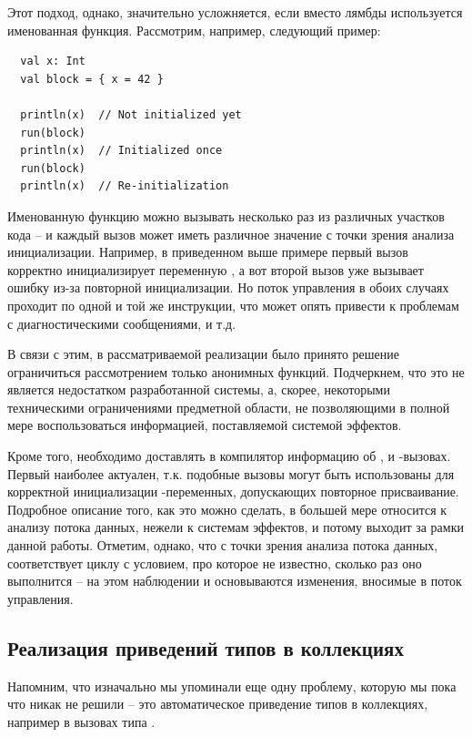 Этот подход, однако, значительно усложняется, если вместо лямбды используется именованная функция. Рассмотрим, например, следующий пример:

\begin{verbatim}
  val x: Int
  val block = { x = 42 }

  println(x)  // Not initialized yet
  run(block)
  println(x)  // Initialized once
  run(block)
  println(x)  // Re-initialization
\end{verbatim}

Именованную функцию можно вызывать несколько раз из различных участков кода -- и каждый вызов может иметь различное значение с точки зрения анализа инициализации. Например, в приведенном выше примере первый вызов корректно инициализирует переменную , а вот второй вызов уже вызывает ошибку из-за повторной инициализации. Но поток управления в обоих случаях проходит по одной и той же инструкции, что может опять привести к проблемам с диагностическими сообщениями, и т.д.

В связи с этим, в рассматриваемой реализации было принято решение ограничиться рассмотрением только анонимных функций. Подчеркнем, что это не является недостатком разработанной системы, а, скорее, некоторыми техническими ограничениями предметной области, не позволяющими в полной мере воспользоваться информацией, поставляемой системой эффектов.

Кроме того, необходимо доставлять в компилятор информацию об ,  и -вызовах. Первый наиболее актуален, т.к. подобные вызовы могут быть использованы для корректной инициализации -переменных, допускающих повторное присваивание. Подробное описание того, как это можно сделать, в большей мере относится к анализу потока данных, нежели к системам эффектов, и потому выходит за рамки данной работы. Отметим, однако, что с точки зрения анализа потока данных,  соответствует циклу  с условием, про которое не известно, сколько раз оно выполнится -- на этом наблюдении и основываются изменения, вносимые в поток управления.


\subsection{Реализация приведений типов в коллекциях}

Напомним, что изначально мы упоминали еще одну проблему, которую мы пока что никак не решили -- это автоматическое приведение типов в коллекциях, например в вызовах типа .


